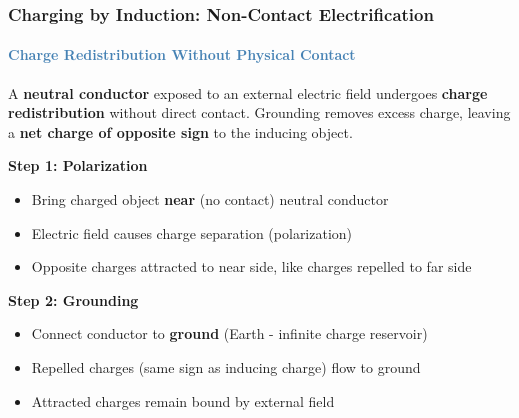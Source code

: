 \begin{frame}
\frametitle{\textsf{\textbf{Charging by Induction:} Non-Contact Electrification}}
\framesubtitle{\textcolor{steelblue}{Charge Redistribution Without Physical Contact}}

\vspace{-0.05cm}

\begin{keybox}
\vspace{0.1cm}
A \textbf{neutral conductor} exposed to an external electric field undergoes \textbf{charge redistribution} without direct contact. Grounding removes excess charge, leaving a \textbf{net charge of opposite sign} to the inducing object.
\vspace{0.05cm}
\end{keybox}

\vspace{0.25cm}

\begin{examplebox}
\vspace{0.1cm}

\textbf{Step 1: Polarization}
\begin{itemize}
    \item Bring charged object \textbf{near} (no contact) neutral conductor
    \item Electric field causes charge separation (polarization)
    \item Opposite charges attracted to near side, like charges repelled to far side
\end{itemize}

\vspace{0.15cm}

\textbf{Step 2: Grounding}
\begin{itemize}
    \item Connect conductor to \textbf{ground} (Earth - infinite charge reservoir)
    \item Repelled charges (same sign as inducing charge) flow to ground
    \item Attracted charges remain bound by external field
\end{itemize}

\vspace{0.15cm}


\end{examplebox}
\end{frame}
